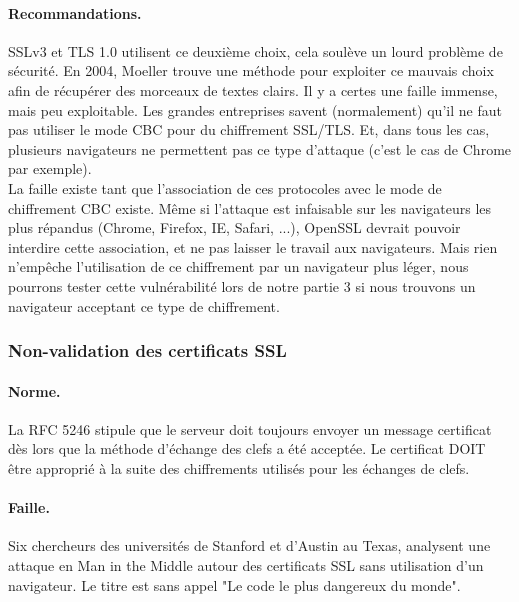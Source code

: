 \paragraph{Recommandations.\\}
SSLv3 et TLS 1.0 utilisent ce deuxième choix, cela soulève un lourd problème de sécurité. En 2004, Moeller trouve une méthode pour exploiter ce mauvais choix afin de récupérer des morceaux de textes clairs. Il y a certes une faille immense, mais peu exploitable. Les grandes entreprises savent (normalement) qu'il ne faut pas utiliser le mode CBC pour du chiffrement SSL/TLS. Et, dans tous les cas, plusieurs navigateurs ne permettent pas ce type d'attaque (c'est le cas de Chrome par exemple).\\

La faille existe tant que l'association de ces protocoles avec le mode de chiffrement CBC existe. Même si l'attaque est infaisable sur les navigateurs les plus répandus (Chrome, Firefox, IE, Safari, ...), OpenSSL devrait pouvoir interdire cette association, et ne pas laisser le travail aux navigateurs. Mais rien n'empêche l'utilisation de ce chiffrement par un navigateur plus léger, nous pourrons tester cette vulnérabilité lors de notre partie 3 si nous trouvons un navigateur acceptant ce type de chiffrement.

\subsubsection{Non-validation des certificats SSL}

\paragraph{Norme.\\}
La RFC 5246 stipule que le serveur doit toujours envoyer un message certificat dès lors que la méthode d'échange des clefs a été acceptée. 
Le certificat DOIT être approprié à la suite des chiffrements utilisés pour les échanges de clefs.\\

\paragraph{Faille.\\}
Six chercheurs des universités de Stanford et d'Austin au Texas, analysent une attaque en Man in the Middle autour des certificats SSL sans utilisation d'un navigateur. Le titre est sans appel "Le code le plus dangereux du monde".\\


